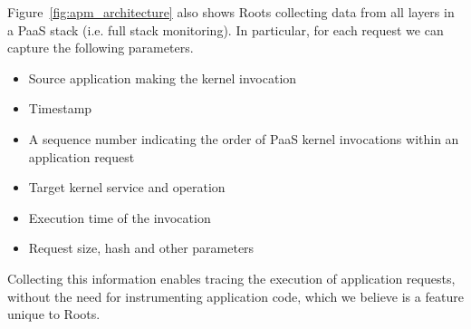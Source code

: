 Figure~\ref{fig:apm_architecture} also shows Roots collecting data from all
layers in a 
PaaS stack (i.e. full stack monitoring). 
%
%
In particular, for each request 
we can capture the 
following parameters.
\begin{itemize}
\item Source application making the kernel invocation
\item Timestamp
\item A sequence number indicating the order of PaaS kernel invocations within an application request
\item Target kernel service and operation
\item Execution time of the invocation
\item Request size, hash and other parameters
\end{itemize}
Collecting this 
information
enables tracing the execution of application 
requests, without the need for instrumenting application code, which we believe is a feature 
unique to Roots. 

